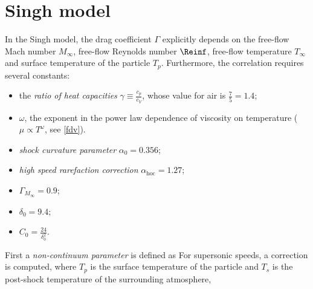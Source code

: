 \section{Singh model} \label{DS}
    In the Singh model, the drag coefficient $\Gamma$ explicitly depends on the
    free-flow Mach number $M_\infty$, free-flow Reynolds number $\Reinf$,
    free-flow temperature $T_\infty$ and surface temperature of the particle $T_p$.
    Furthermore, the correlation requires several constants:
    \begin{itemize}
        \item the \emph{ratio of heat capacities} $\gamma \equiv \frac{c_p}{c_V}$,
            whose value for air is $\frac{7}{5} = \num{1.4}$;
        \item $\omega$, the exponent in the power law dependence
            of viscosity on temperature ($\mu \propto T^\omega$, see \cref{fdv}).
        \item \emph{shock curvature parameter} $\alpha_0 = \num{0.356}$;
        \item \emph{high speed rarefaction correction} $\alpha_\mathrm{hoc} = \num{1.27}$;
        \item \emph{} $\Gamma_{M_\infty} = \num{0.9}$;
        \item \emph{} $\delta_0 = \num{9.4}$;
        \item $C_0 = \frac{24}{\delta_0^2}$.
    \end{itemize}

    First a \emph{non-continuum parameter} is defined as
    For supersonic speeds, a correction is computed,
    where $T_p$ is the surface temperature of the particle and
    $T_s$ is the post-shock temperature of the surrounding atmosphere,

